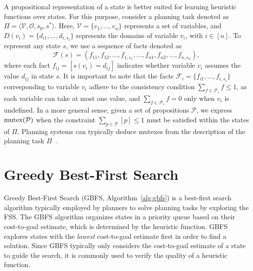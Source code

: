 \documentclass[ppgc,diss,english]{iiufrgs}
\begin{document}
A propositional representation of a state is better suited for learning heuristic functions over states. For this purpose, consider a planning task denoted as $\Pi=\langle\mathcal{V},\mathcal{O},s_0,s^*\rangle$. Here, $\mathcal{V}=\{v_1,\ldots,v_n\}$ represents a set of variables, and $D(v_i)=\{d_{i1},\ldots,d_{i,s_i}\}$ represents the domains of variable $v_i$, with $i\in[n]$. To represent any state $s$, we use a sequence of facts denoted as
$$\mathcal{F}(s)=(f_{11},f_{12},\ldots,f_{1,s_1},\ldots,f_{n1},f_{n2},\ldots,f_{n,s_n}),$$ where each fact $f_{ij}=[s(v_i)=d_{ij}]$ indicates whether variable $v_i$ assumes the value $d_{ij}$ in state $s$. It is important to note that the facts $\mathcal{F}_i=\{f_{i1},\ldots,f_{i,s_i}\}$ corresponding to variable $v_i$ adhere to the consistency condition $\sum_{f\in \mathcal{F}_i} f\leq 1$, as each variable can take at most one value, and $\sum_{f\in \mathcal{F}_i} f=0$ only when $v_i$ is undefined. In a more general sense, given a set of propositions $\mathcal{P}$, we express $\operatorname{mutex}(\mathcal{P})$ when the constraint $\sum_{p\in \mathcal{P}} [p]\leq 1$ must be satisfied within the states of $\Pi$. Planning systems can typically deduce mutexes from the description of the planning task $\Pi$~\cite{Helmert/2009}.

\section{Greedy Best-First Search}
Greedy Best-First Search (GBFS, Algorithm~\ref{alg:gbfs}) is a best-first search algorithm typically employed by planners to solve planning tasks by exploring the FSS. The GBFS algorithm organizes states in a priority queue based on their cost-to-goal estimate, which is determined by the heuristic function. GBFS explores states with the \emph{lowest} cost-to-goal estimate first in order to find a solution. Since GBFS typically only considers the cost-to-goal estimate of a state to guide the search, it is commonly used to verify the quality of a heuristic function.
\end{document}
